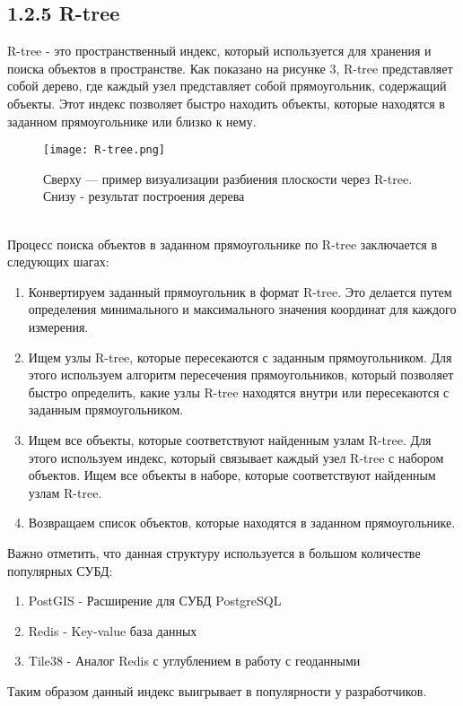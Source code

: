 \subsection{1.2.5 R-tree}
R-tree - это пространственный индекс, который используется для хранения и поиска объектов в пространстве. Как показано на рисунке 3, R-tree представляет собой дерево, где каждый узел представляет собой прямоугольник, содержащий объекты. Этот индекс позволяет быстро находить объекты, которые находятся в заданном прямоугольнике или близко к нему.
  \\
\begin{figure}[h]
    \centering
    \texttt{[image: R-tree.png]}
    \caption{Сверху — пример визуализации разбиения плоскости через R-tree. Снизу - результат построения дерева}
\end{figure}
  \\
Процесс поиска объектов в заданном прямоугольнике по R-tree заключается в следующих шагах:

\begin{enumerate}
    \item Конвертируем заданный прямоугольник в формат R-tree. Это делается путем определения минимального и максимального значения координат для каждого измерения.
    \item Ищем узлы R-tree, которые пересекаются с заданным прямоугольником. Для этого используем алгоритм пересечения прямоугольников, который позволяет быстро определить, какие узлы R-tree находятся внутри или пересекаются с заданным прямоугольником.
    \item Ищем все объекты, которые соответствуют найденным узлам R-tree. Для этого используем индекс, который связывает каждый узел R-tree с набором объектов. Ищем все объекты в наборе, которые соответствуют найденным узлам R-tree.
    \item Возвращаем список объектов, которые находятся в заданном прямоугольнике.
\end{enumerate}

Важно отметить, что данная структуру используется в большом количестве популярных СУБД: 
\begin{enumerate}
    \item PostGIS - Расширение для СУБД PostgreSQL
    \item Redis - Key-value база данных
    \item Tile38 - Аналог Redis с углублением в работу с геоданными
\end{enumerate}
Таким образом данный индекс выигрывает в популярности у разработчиков. 


